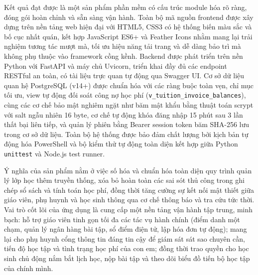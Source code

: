 \documentclass[12pt,a4paper]{report}
\begin{document}
Kết quả đạt được là một sản phẩm phần mềm có cấu trúc module hóa rõ ràng, đóng gói hoàn chỉnh và sẵn sàng vận hành. Toàn bộ mã nguồn frontend được xây dựng trên nền tảng web hiện đại với HTML5, CSS3 có hệ thống biến màu sắc và bố cục nhất quán, kết hợp JavaScript ES6+ và Feather Icons nhằm mang lại trải nghiệm tương tác mượt mà, tối ưu hiệu năng tải trang và dễ dàng bảo trì mà không phụ thuộc vào framework cồng kềnh. Backend được phát triển trên nền Python với FastAPI và máy chủ Uvicorn, triển khai đầy đủ các endpoint RESTful an toàn, có tài liệu trực quan tự động qua Swagger UI. Cơ sở dữ liệu quan hệ PostgreSQL (v14+) được chuẩn hóa với các ràng buộc toàn vẹn, chỉ mục tối ưu, view tự động đối soát công nợ học phí (\texttt{v\_tuition\_invoice\_balances}), cùng các cơ chế bảo mật nghiêm ngặt như băm mật khẩu bằng thuật toán scrypt với salt ngẫu nhiên 16 byte, cơ chế tự động khóa đăng nhập 15 phút sau 3 lần thất bại liên tiếp, và quản lý phiên bằng Bearer session token băm SHA-256 lưu trong cơ sở dữ liệu. Toàn bộ hệ thống được bảo đảm chất lượng bởi kịch bản tự động hóa PowerShell và bộ kiểm thử tự động toàn diện kết hợp giữa Python \texttt{unittest} và Node.js test runner.

Ý nghĩa của sản phẩm nằm ở việc số hóa và chuẩn hóa toàn diện quy trình quản lý lớp học thêm truyền thống, xóa bỏ hoàn toàn các sai sót thủ công trong ghi chép sổ sách và tính toán học phí, đồng thời tăng cường sự kết nối mật thiết giữa giáo viên, phụ huynh và học sinh thông qua cơ chế thông báo và tra cứu tức thời. Vai trò cốt lõi của ứng dụng là cung cấp một nền tảng vận hành tập trung, minh bạch: hỗ trợ giáo viên tinh gọn tối đa các tác vụ hành chính (điểm danh một chạm, quản lý ngân hàng bài tập, sổ điểm điện tử, lập hóa đơn tự động); mang lại cho phụ huynh cổng thông tin đáng tin cậy để giám sát sát sao chuyên cần, tiến độ học tập và tình trạng học phí của con em; đồng thời trao quyền cho học sinh chủ động nắm bắt lịch học, nộp bài tập và theo dõi biểu đồ tiến bộ học tập của chính mình.
\end{document}
